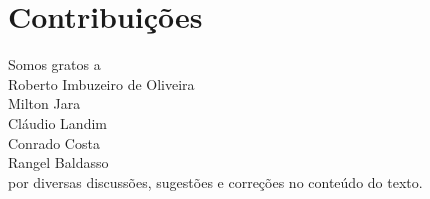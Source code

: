 \chapter*{Contribuições}

Somos gratos a\\

\noindent
Roberto Imbuzeiro de Oliveira\\
Milton Jara\\
Cláudio Landim\\
Conrado Costa\\
Rangel Baldasso\\

\noindent
por diversas discussões, sugestões e correções no conteúdo do texto.

